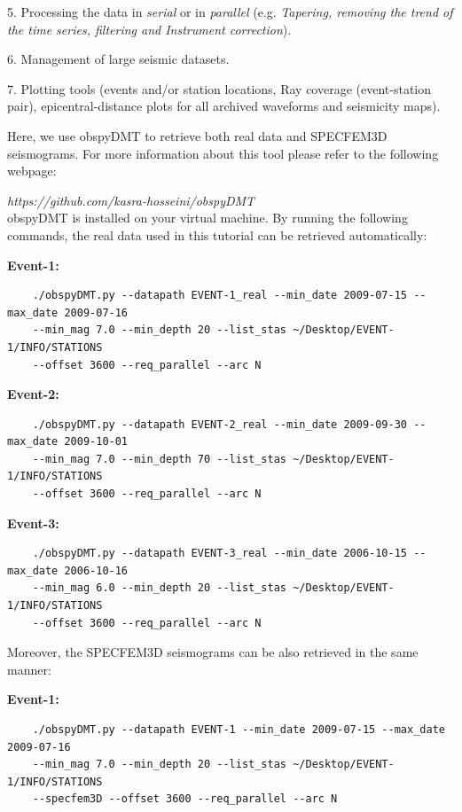 \documentclass{article}
\begin{document}
5. Processing the data in \textit{serial} or in \textit{parallel} (e.g. \textit{Tapering,
removing the trend of the time series, filtering and Instrument correction}).

6. Management of large seismic datasets.

7. Plotting tools (events and/or station locations, Ray coverage (event-station
pair), epicentral-distance plots for all archived waveforms and seismicity maps).

\vspace{13pt}
Here, we use obspyDMT to retrieve both real data and SPECFEM3D seismograms. For
more information about this tool please refer to the following webpage:

{\color{color18} \emph{https://github.com/kasra-hosseini/obspyDMT}}  \\

obspyDMT is installed on your virtual machine. By running the following commands,
the real data used in this tutorial can be retrieved automatically:

\textbf{Event-1:}

\begin{verbatim}
    ./obspyDMT.py --datapath EVENT-1_real --min_date 2009-07-15 --max_date 2009-07-16
    --min_mag 7.0 --min_depth 20 --list_stas ~/Desktop/EVENT-1/INFO/STATIONS
    --offset 3600 --req_parallel --arc N
\end{verbatim}

\textbf{Event-2:}

\begin{verbatim}
    ./obspyDMT.py --datapath EVENT-2_real --min_date 2009-09-30 --max_date 2009-10-01
    --min_mag 7.0 --min_depth 70 --list_stas ~/Desktop/EVENT-1/INFO/STATIONS
    --offset 3600 --req_parallel --arc N
\end{verbatim}

\textbf{Event-3:}

\begin{verbatim}
    ./obspyDMT.py --datapath EVENT-3_real --min_date 2006-10-15 --max_date 2006-10-16
    --min_mag 6.0 --min_depth 20 --list_stas ~/Desktop/EVENT-1/INFO/STATIONS
    --offset 3600 --req_parallel --arc N
\end{verbatim}

Moreover, the SPECFEM3D seismograms can be also retrieved in the same manner:

\textbf{Event-1:}

\begin{verbatim}
    ./obspyDMT.py --datapath EVENT-1 --min_date 2009-07-15 --max_date 2009-07-16
    --min_mag 7.0 --min_depth 20 --list_stas ~/Desktop/EVENT-1/INFO/STATIONS
    --specfem3D --offset 3600 --req_parallel --arc N
\end{verbatim}
\end{document}
